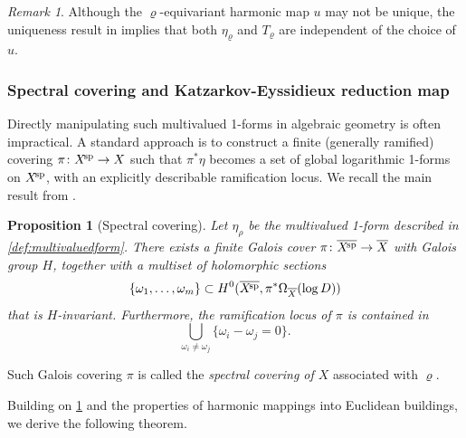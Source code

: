 \documentclass[english]{amsproc}
\theoremstyle{plain}
\newtheorem{proposition}[thm]{Proposition}
\theoremstyle{definition}
\theoremstyle{remark}
\newtheorem{rem}[thm]{Remark}
\theoremstyle{plain}
\numberwithin{equation}{thm} %
\newcommand{\xsp}{X^{\! \rm sp}}
\begin{document}
\begin{rem}
	Although the $\varrho$-equivariant harmonic map $u$ may not be unique, the uniqueness result in \cite{DM24} implies that both $\eta_\varrho$ and $T_\varrho$ are independent of the choice of $u$.
\end{rem}


\subsubsection{Spectral covering and Katzarkov-Eyssidieux reduction map}

Directly manipulating such multivalued 1-forms in algebraic geometry is often impractical. A standard approach is to construct a finite (generally ramified) covering $\pi \colon \xsp \to X$ such that $\pi^*\eta$ becomes a set of global logarithmic 1-forms on $\xsp$, with an explicitly describable ramification locus. We recall the main result from \cite[Proposition 3.1]{CDY22}.

\begin{proposition}[Spectral covering]\label{prop:spectral}
	Let $\eta_\rho$ be the multivalued 1-form described in \cref{def:multivaluedform}. There exists a finite Galois cover $\pi \colon \overline{\xsp} \to \overline{X}$ with Galois group $H$, together with a multiset of holomorphic sections 
	\[
	\{\omega_1, \dots, \omega_m\} \subset H^0(\overline{\xsp}, \pi^*\Omega_{\overline{X}}(\log D))
	\]
	that is $H$-invariant. Furthermore, the ramification locus of $\pi$ is contained in 
	\[
	\bigcup_{\omega_i \neq \omega_j} \{ \omega_i - \omega_j = 0 \}. 
	\]
\end{proposition}
Such Galois covering $\pi$ is called the \emph{spectral covering of $X$} associated with $\varrho$. 

Building on \cref{prop:spectral} and the properties of harmonic mappings into Euclidean buildings, we derive the following theorem.
\end{document}
